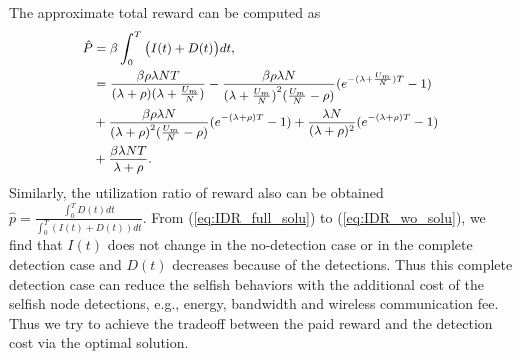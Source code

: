 The approximate total reward can be computed as
\begin{equation}
\begin{small}
\nonumber
\begin{aligned}
\hat{P} &= \beta \int_{0}^{T} \big( I(t) + D(t) \big) dt, \\
& = \frac{\beta \rho \lambda N T}{ (\lambda + \rho)(\lambda + \frac{U_{m}}{N}) }
- \frac{\beta \rho \lambda N}{ {(\lambda + \frac{U_{m}}{N})}^{2} (\frac{U_{m}}{N} - \rho)}
(e^{-(\lambda + \frac{U_{m}}{N})T} - 1 ) \\
&+ \frac{\beta \rho \lambda N }{ {(\lambda + \rho)}^{2} (\frac{U_{m}}{N} - \rho) }
(e^{-(\lambda + \rho)T} - 1 )
+ \frac{ \lambda N }{ (\lambda + \rho)^2 } (e^{-(\lambda + \rho)T} - 1 ) \\
& + \frac{ \beta \lambda N T }{ \lambda + \rho }.
\end{aligned}
\end{small}
\end{equation}
Similarly, the utilization ratio of reward also can be obtained
$\hat{p} = \frac{\int_{0}^{T} D(t) dt}{\int_{0}^{T} (I(t) + D(t))dt}$.
From (\ref{eq:IDR_full_solu}) to (\ref{eq:IDR_wo_solu}),
we find that $I(t)$ does not change 
in the no-detection case or in the complete detection case
and $D(t)$ decreases because of the detections.
Thus this complete detection case can reduce the selfish behaviors
with the additional cost of the selfish node detections,
e.g., energy, bandwidth and wireless communication fee.
Thus we try to achieve the tradeoff between the paid reward
and the detection cost
via the optimal solution.
